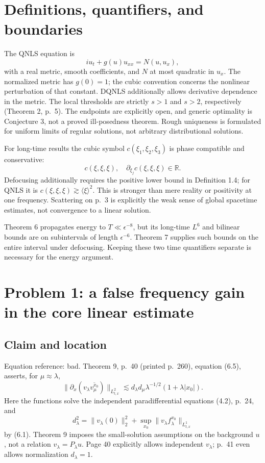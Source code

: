\documentclass[10pt]{article}
\begin{document}
\section*{Definitions, quantifiers, and boundaries}
The QNLS equation is \[i u_t+g(u)u_{xx}=N(u,u_x),\] with a real metric, smooth coefficients, and \(N\) at most quadratic in \(u_x\). The normalized metric has \(g(0)=1\); the cubic convention concerns the nonlinear perturbation of that constant. DQNLS additionally allows derivative dependence in the metric. The local thresholds are strictly \(s>1\) and \(s>2\), respectively (Theorem 2, p. 5). The endpoints are explicitly open, and generic optimality is Conjecture 3, not a proved ill-posedness theorem. Rough uniqueness is formulated for uniform limits of regular solutions, not arbitrary distributional solutions.\par
For long-time results the cubic symbol \(c(\xi_1,\xi_2,\xi_3)\) is phase compatible and conservative: \[c(\xi,\xi,\xi),\quad \partial_{\xi_j}c(\xi,\xi,\xi)\in\mathbb R.\] Defocusing additionally requires the positive lower bound in Definition 1.4; for QNLS it is \(c(\xi,\xi,\xi)\gtrsim\langle\xi\rangle^2\). This is stronger than mere reality or positivity at one frequency. Scattering on p. 3 is explicitly the weak sense of global spacetime estimates, not convergence to a linear solution.\par
Theorem 6 propagates energy to \(T\ll\epsilon^{-8}\), but its long-time \(L^6\) and bilinear bounds are on subintervals of length \(\epsilon^{-6}\). Theorem 7 supplies such bounds on the entire interval under defocusing. Keeping these two time quantifiers separate is necessary for the energy argument.\par
\section*{Problem 1: a false frequency gain in the core linear estimate}
\subsection*{Claim and location}
Equation reference: bad. Theorem 9, p. 40 (printed p. 260), equation (6.5), asserts, for \(\mu\approx\lambda\), \[
 \|\partial_x(v_\lambda\overline{v_\mu^{x_0}})\|_{L^2_{t,x}}
 \lesssim d_\lambda d_\mu\lambda^{-1/2}(1+\lambda|x_0|).\] Here the functions solve the independent paradifferential equations (4.2), p. 24, and \[d_\lambda^2=\|v_\lambda(0)\|_2^2+
       \sup_{x_0}\|v_\lambda f_\lambda^{x_0}\|_{L^1_{t,x}}\] by (6.1). Theorem 9 imposes the small-solution assumptions on the background \(u\), not a relation \(v_\lambda=P_\lambda u\). Page 40 explicitly allows independent \(v_\lambda\); p. 41 even allows normalization \(d_\lambda=1\).\par
\end{document}

